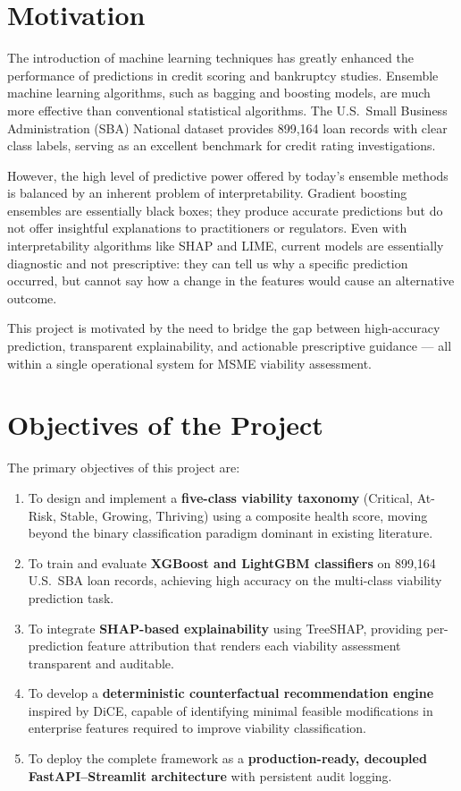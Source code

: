 \documentclass[12pt,a4paper]{report}
\begin{document}
\section{Motivation}

The introduction of machine learning techniques has greatly enhanced the performance of predictions in credit scoring and bankruptcy studies. Ensemble machine learning algorithms, such as bagging and boosting models, are much more effective than conventional statistical algorithms. The U.S.\ Small Business Administration (SBA) National dataset provides 899,164 loan records with clear class labels, serving as an excellent benchmark for credit rating investigations.

However, the high level of predictive power offered by today's ensemble methods is balanced by an inherent problem of interpretability. Gradient boosting ensembles are essentially black boxes; they produce accurate predictions but do not offer insightful explanations to practitioners or regulators. Even with interpretability algorithms like SHAP and LIME, current models are essentially diagnostic and not prescriptive: they can tell us why a specific prediction occurred, but cannot say how a change in the features would cause an alternative outcome.

This project is motivated by the need to bridge the gap between high-accuracy prediction, transparent explainability, and actionable prescriptive guidance --- all within a single operational system for MSME viability assessment.

\section{Objectives of the Project}

The primary objectives of this project are:
\begin{enumerate}
    \item To design and implement a \textbf{five-class viability taxonomy} (Critical, At-Risk, Stable, Growing, Thriving) using a composite health score, moving beyond the binary classification paradigm dominant in existing literature.
    \item To train and evaluate \textbf{XGBoost and LightGBM classifiers} on 899,164 U.S.\ SBA loan records, achieving high accuracy on the multi-class viability prediction task.
    \item To integrate \textbf{SHAP-based explainability} using TreeSHAP, providing per-prediction feature attribution that renders each viability assessment transparent and auditable.
    \item To develop a \textbf{deterministic counterfactual recommendation engine} inspired by DiCE, capable of identifying minimal feasible modifications in enterprise features required to improve viability classification.
    \item To deploy the complete framework as a \textbf{production-ready, decoupled FastAPI--Streamlit architecture} with persistent audit logging.
\end{enumerate}
\end{document}
